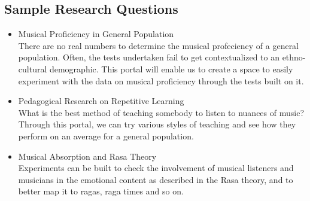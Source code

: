 \documentclass{tufte-handout}
\begin{document}
\subsection{Sample Research Questions}

\begin{itemize}
\item Musical Proficiency in General Population\\
There are no real numbers to determine the musical profeciency of a general population. Often, the tests undertaken fail to get contextualized to an ethno-cultural demographic. This portal will enable us to create a space to easily experiment with the data on musical proficiency through the tests built on it.

\item Pedagogical Research on Repetitive Learning\\
What is the best method of teaching somebody to listen to nuances of music? Through this portal, we can try various styles of teaching and see how they perform on an average for a general population.

\item Musical Absorption and Rasa Theory\\
Experiments can be built to check the involvement of musical listeners and musicians in the emotional content as described in the Rasa theory, and to better map it to ragas, raga times and so on.
\end{itemize}
\end{document}
